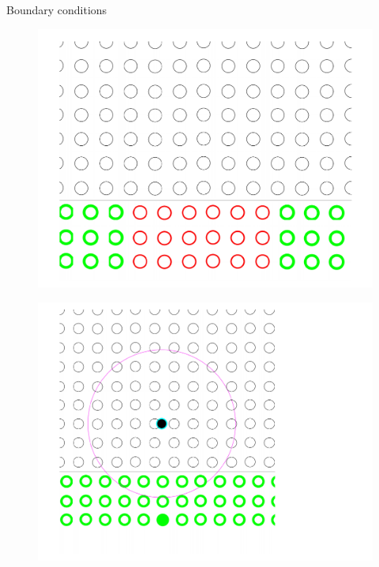 \documentclass{beamer}
\begin{document}
\begin{frame}{Boundary conditions}
\begin{minipage}{0.325 \textwidth}
\begin{figure}
\end{figure}
\end{minipage}
\begin{minipage}{0.325\textwidth}
\begin{figure}
\includegraphics[width=0.67 \textwidth]{./PPT/BC_erupt}
\end{figure}
\end{minipage}
\begin{minipage}{0.325\textwidth}
\begin{figure}
\includegraphics[width=0.71 \textwidth]{./PPT/BC_wall1}
\end{figure}
\end{minipage}
\end{frame}

\end{document}
